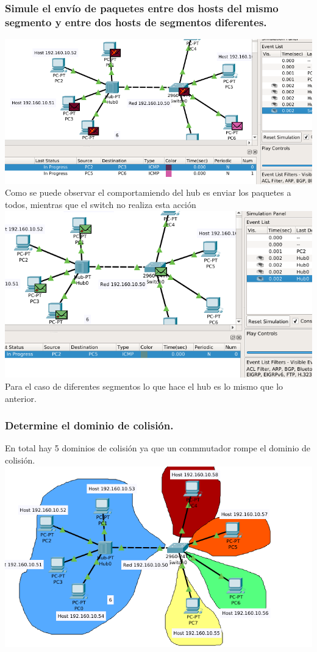 \subsubsection{Simule el env\'io de paquetes entre dos hosts del mismo segmento y entre dos hosts de segmentos diferentes.}
\includegraphics[scale=0.5]{img/simulacion1.png} \\
Como se puede observar el comportamiendo del hub es enviar los paquetes a todos, mientras que el switch no realiza esta acci\'on\\
\includegraphics[scale=0.5]{img/simulacion2.png} \\
Para el caso de diferentes segmentos lo que hace el hub es lo mismo que lo anterior.
\subsubsection{Determine el dominio de colisi\'on.}
En total hay 5 dominios de colisi\'on ya que un conmmutador rompe el dominio de colisi\'on.
\includegraphics[scale=0.6]{img/dominio.png} 


